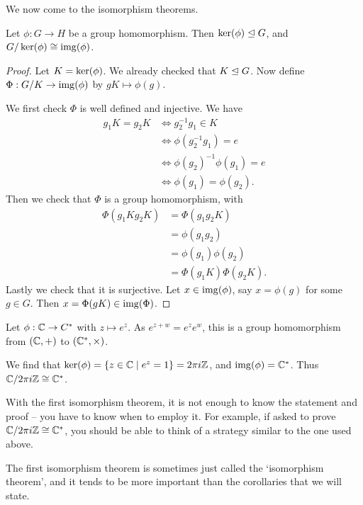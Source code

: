 \documentclass[a4paper]{scrartcl}
\begin{document}
We now come to the isomorphism theorems.

\begin{theorem}
	Let $\phi: G \rightarrow H$ be a group homomorphism. Then $\operatorname{ker}(\phi) \trianglelefteq G$, and $G/\operatorname{ker}(\phi) \cong \operatorname{img}(\phi)$.
\end{theorem}
\begin{proof}
	Let $K = \operatorname{ker}(\phi)$. We already checked that $K \trianglelefteq G$. Now define $\Phi: G/K \rightarrow \operatorname{img}(\phi)$ by $gK \mapsto \phi(g)$.

	We first check $\Phi$ is well defined and injective. We have
	\begin{align*}
		g_1K = g_2K &\iff g_2^{-1} g_1 \in K \\
		&\iff \phi(g_2^{-1}g_1) = e \\
		&\iff \phi(g_2)^{-1} \phi(g_1) = e  \\
		&\iff \phi(g_1) = \phi(g_2).
	\end{align*}
	Then we check that $\Phi$ is a group homomorphism, with
	\begin{align*}
		\Phi(g_1 K g_2 K) &= \Phi(g_1 g_2 K) \\
			&= \phi(g_1 g_2) \\
			&= \phi(g_1) \phi(g_2) \\
			&= \Phi(g_1 K) \Phi(g_2 K).
	\end{align*}
	Lastly we check that it is surjective. Let $x \in \operatorname{img}(\phi)$, say $x = \phi(g)$ for some $g \in G$. Then $x = \Phi(gK) \in \operatorname{img}(\Phi)$.
\end{proof}

\begin{example}
	Let $\phi : \mathbb{C} \rightarrow C^{*}$ with $z \mapsto e^z$. As $e^{z + w} = e^z e^w$, this is a group homomorphism from $(\mathbb{C}, +)$ to $(\mathbb{C}^*, \times)$. 

	We find that $\operatorname{ker}(\phi) = \{ z \in \mathbb{C} \mid e^z = 1 \} = 2 \pi i \mathbb{Z}$, and $\operatorname{img}(\phi) = \mathbb{C}^*$. Thus $\mathbb{C}/2 \pi i \mathbb{Z} \cong \mathbb{C}^*$.
\end{example}

With the first isomorphism theorem, it is not enough to know the statement and proof -- you have to know when to employ it. For example, if asked to prove $\mathbb{C}/2 \pi i \mathbb{Z} \cong \mathbb{C}^*$, you should be able to think of a strategy similar to the one used above.

The first isomorphism theorem is sometimes just called the `isomorphism theorem', and it tends to be more important than the corollaries that we will state.
\end{document}
